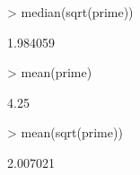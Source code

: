 \documentclass[letterpaper,12pt]{article}
\begin{document}
\begin{enumerate}
\begin{Schunk}
\begin{Sinput}
> median(sqrt(prime))
\end{Sinput}
\begin{Soutput}
[1] 1.984059
\end{Soutput}
\begin{Sinput}
> mean(prime)
\end{Sinput}
\begin{Soutput}
[1] 4.25
\end{Soutput}
\begin{Sinput}
> mean(sqrt(prime))
\end{Sinput}
\begin{Soutput}
[1] 2.007021
\end{Soutput}
\end{Schunk}
  \end{enumerate}
\end{document}
